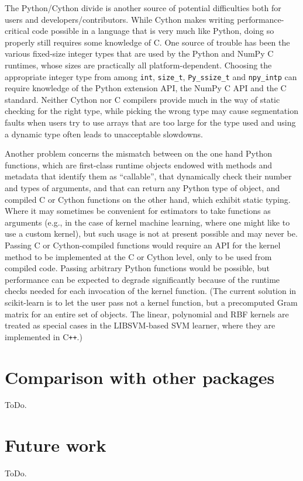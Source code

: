 \documentclass[a4paper,twocolumn]{article}
\DeclareRobustCommand{\VAN}[3]{#2}
\begin{document}
The Python/Cython divide is another source of potential difficulties
both for users and developers/contributors.
While Cython makes writing performance-critical code possible
in a language that is very much like Python,
doing so properly still requires some knowledge of C.
One source of trouble has been the various fixed-size integer types
that are used by the Python and NumPy C runtimes,
whose sizes are practically all platform-dependent.
Choosing the appropriate integer type from among
\texttt{int}, \texttt{size\_t}, \texttt{Py\_ssize\_t} and \texttt{npy\_intp}
can require knowledge of the Python extension API,
the NumPy C API and the C standard.
Neither Cython nor C compilers provide much in the way of static checking
for the right type,
while picking the wrong type may cause segmentation faults
when users try to use arrays that are too large for the type used
and using a dynamic type often leads to unacceptable slowdowns.

Another problem concerns the mismatch between on the one hand Python functions,
which are first-class runtime objects endowed with methods and metadata
that identify them as ``callable'',
that dynamically check their number and types of arguments,
and that can return any Python type of object,
and compiled C or Cython functions on the other hand,
which exhibit static typing.
Where it may sometimes be convenient for estimators
to take functions as arguments
(e.g., in the case of kernel machine learning,
where one might like to use a custom kernel),
but such usage is not at present possible and may never be.
Passing C or Cython-compiled functions would require an API for the kernel method
to be implemented at the C or Cython level,
only to be used from compiled code.
Passing arbitrary Python functions would be possible,
but performance can be expected to degrade significantly
because of the runtime checks needed for each invocation of the kernel function.
(The current solution in scikit-learn is to let the user pass not a kernel function,
but a precomputed Gram matrix for an entire set of objects.
The linear, polynomial and RBF kernels are treated as special cases in
the \textsf{LIBSVM}-based SVM learner, where they are implemented in C{}\verb!++!.)

\section{Comparison with other packages}

ToDo.

\section{Future work}

ToDo.


\DeclareRobustCommand{\VAN}[3]{#3}

\end{document}
